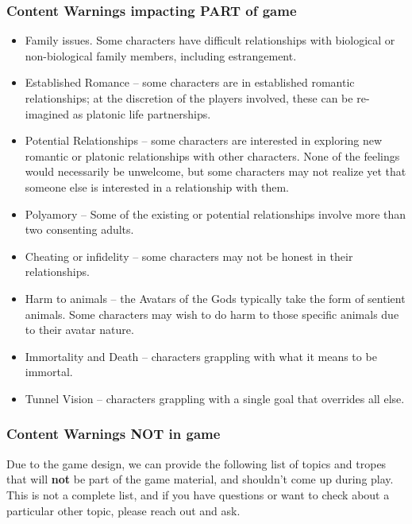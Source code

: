 \documentclass[sheet]{GL2020}
\begin{document}
\subsubsection{Content Warnings impacting PART of game}
\begin{multicols}{2}
\begin{itemize}
  	\item Family issues. Some characters have difficult relationships with biological or non-biological family members, including estrangement.
	\item Established Romance -- some characters are in established romantic relationships; at the discretion of the players involved, these can be re-imagined as platonic life partnerships.
	\item Potential Relationships -- some characters are interested in exploring new romantic or platonic relationships with other characters. None of the feelings would necessarily be unwelcome, but some characters may not realize yet that someone else is interested in a relationship with them.
	\item Polyamory -- Some of the existing or potential relationships involve more than two consenting adults.
	\item Cheating or infidelity -- some characters may not be honest in their relationships.
	\item Harm to animals -- the Avatars of the Gods typically take the form of sentient animals. Some characters may wish to do harm to those specific animals due to their avatar nature.
	\item Immortality and Death -- characters grappling with what it means to be immortal.
	\item Tunnel Vision -- characters grappling with a single goal that overrides all else.
\end{itemize}
\end{multicols}

\subsubsection{Content Warnings NOT in game}
Due to the game design, we can provide the following list of topics and tropes that will \textbf{not} be part of the game material, and shouldn’t come up during play. This is not a complete list, and if you have questions or want to check about a particular other topic, please reach out and ask.
\end{document}
